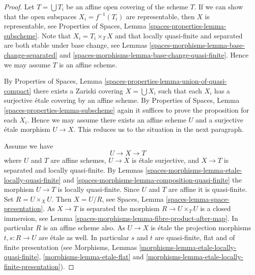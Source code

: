 \begin{proof}
Let $T = \bigcup T_i$ be an affine open covering of the scheme $T$.
If we can show that the open subspaces $X_i = f^{-1}(T_i)$ are
representable, then $X$ is representable, see
Properties of Spaces, Lemma \ref{spaces-properties-lemma-subscheme}.
Note that $X_i = T_i \times_T X$ and that locally quasi-finite and
separated are both stable under base change, see
Lemmas \ref{spaces-morphisms-lemma-base-change-separated} and
\ref{spaces-morphisms-lemma-base-change-quasi-finite}.
Hence we may assume $T$ is an affine scheme.

\medskip\noindent
By
Properties of Spaces,
Lemma \ref{spaces-properties-lemma-union-of-quasi-compact}
there exists a Zariski covering $X = \bigcup X_i$
such that each $X_i$ has a surjective \'etale covering by
an affine scheme. By
Properties of Spaces, Lemma \ref{spaces-properties-lemma-subscheme}
again it suffices to prove the proposition for each $X_i$.
Hence we may assume there exists an affine scheme $U$ and a
surjective \'etale morphism $U \to X$. This reduces us to the
situation in the next paragraph.

\medskip\noindent
Assume we have
$$
U \longrightarrow X \longrightarrow T
$$
where $U$ and $T$ are affine schemes, $U \to X$ is \'etale surjective, and
$X \to T$ is separated and locally quasi-finite. By
Lemmas \ref{spaces-morphisms-lemma-etale-locally-quasi-finite} and
\ref{spaces-morphisms-lemma-composition-quasi-finite}
the morphism $U \to T$ is locally quasi-finite.
Since $U$ and $T$ are affine it is quasi-finite.
Set $R = U \times_X U$. Then $X = U/R$, see
Spaces, Lemma \ref{spaces-lemma-space-presentation}.
As $X \to T$ is separated the
morphism $R \to U \times_T U$ is a closed immersion, see
Lemma \ref{spaces-morphisms-lemma-fibre-product-after-map}.
In particular $R$ is an affine scheme also.
As $U \to X$ is \'etale the projection morphisms
$t, s : R \to U$ are \'etale as well. In particular $s$ and $t$ are
quasi-finite, flat and of finite presentation (see
Morphisms, Lemmas \ref{morphisms-lemma-etale-locally-quasi-finite},
\ref{morphisms-lemma-etale-flat} and
\ref{morphisms-lemma-etale-locally-finite-presentation}).


\end{proof}
